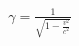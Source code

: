 \documentclass[preview]{standalone}
\begin{document}
\begin{align*}
\gamma = \frac{1}{\sqrt{1-\frac{v^2}{c^2}}}
\end{align*}
\end{document}
